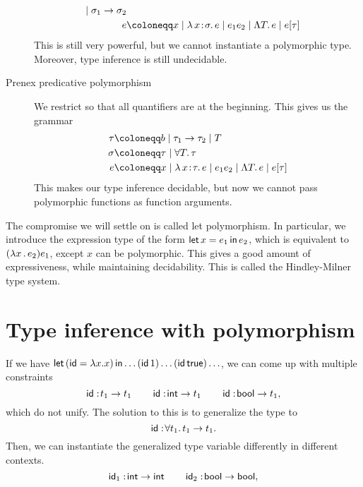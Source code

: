 \documentclass[class=scrartcl]{standalone}
\begin{document}
\begin{description}
\begin{align*}
                                 \mid \sigma_1 \to \sigma_2 \\
          e      &\coloneqq x \mid \lambda\, x \of \sigma .\, e
                              \mid e_1 e_2
                              \mid \Lambda T .\, e
                              \mid e[\tau]
        \end{align*}
        This is still very powerful,
        but we cannot instantiate a polymorphic type.
        Moreover, type inference is still undecidable.
  \item [Prenex predicative polymorphism] We restrict so that
        all quantifiers are at the beginning.
        This gives us the grammar
        \begin{align*}
          \tau   &\coloneqq b \mid \tau_1 \to \tau_2
                              \mid T \\
          \sigma &\coloneqq \tau \mid \forall T .\, \tau \\
          e      &\coloneqq x \mid \lambda\, x \of \tau .\, e
                              \mid e_1 e_2
                              \mid \Lambda T .\, e
                              \mid e[\tau]
        \end{align*}
        This makes our type inference decidable,
        but now we cannot pass polymorphic functions as function arguments.
\end{description}
The compromise we will settle on is called let polymorphism.
In particular, we introduce the expression type of the form
\(\operatorname{\textsf{let}}{x = e_1}\operatorname{\textsf{in}}{e_2}\), which is equivalent to
\((\lambda{x}\operatorname{.}{e_2}){e_1}\), except \(x\) can be polymorphic.
This gives a good amount of expressiveness,
while maintaining decidability.
This is called the Hindley-Milner type system.


\section{Type inference with polymorphism}
If we have
\(\operatorname{\textsf{let}}{(\operatorname{\textsf{id}} = \lambda x. x)}\operatorname{\textsf{in}}{\dots (\operatorname{\textsf{id}} 1) \dots (\operatorname{\textsf{id}} \textsf{true}) \dots}\),
we can come up with multiple constraints
\[
  \operatorname{\textsf{id}} {\hspace{0.1111em}:\hspace{0.1111em}} t_1 \to t_1 \qquad
  \operatorname{\textsf{id}} {\hspace{0.1111em}:\hspace{0.1111em}} \textsf{int} \to t_1 \qquad
  \operatorname{\textsf{id}} {\hspace{0.1111em}:\hspace{0.1111em}} \textsf{bool} \to t_1,
\]
which do not unify.
The solution to this is to generalize the type to
\[
  \operatorname{\textsf{id}} {\hspace{0.1111em}:\hspace{0.1111em}} \forall t_1.\, t_1 \to t_1.
\]
Then, we can instantiate the generalized type variable
differently in different contexts.
\[
  \operatorname{\textsf{id}}_1 {\hspace{0.1111em}:\hspace{0.1111em}} \textsf{int} \to \textsf{int} \qquad
  \operatorname{\textsf{id}}_2 {\hspace{0.1111em}:\hspace{0.1111em}} \textsf{bool} \to \textsf{bool},
\]
\end{document}
